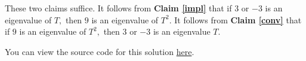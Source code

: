 \documentclass{amsart}
\newcommand{\pagenum}{153}
\newcommand{\probnum}{7}
\begin{document}
These two claims suffice. It follows from
\textsf{\textbf{Claim \ref{impl}}}  that if $3$ or $-3$ is an
eigenvalue of $T,$ then $9$ is an eigenvalue of $T^2$. It follows from
\textsf{\textbf{Claim \ref{conv}}} that if $9$ is an eigenvalue
of $T^2,$
then $3$ or $-3$ is an eigenvalue $T.$

\vspace{0.5in}

\begin{note*}
You can view the source code for this solution
\href{https://github.com/thomasbreydo/linalg/blob/main/\pagenum_\probnum_Thomas_Breydo.tex}
{here}.
\end{note*}
\end{document}
